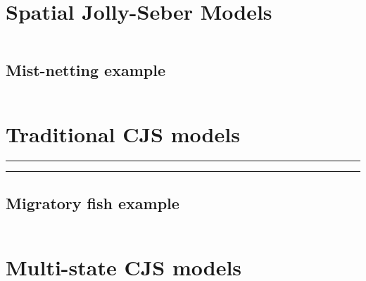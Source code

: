 \section{Spatial Jolly-Seber Models}

\begin{equation}
\label{scr0.eq.norm}
\end{equation}


\subsection{Mist-netting example}

\begin{table}
\centering
\begin{tabular}{crrr}
\hline \hline
\end{tabular}
\label{open.tab.JSmulti}
\end{table}



\begin{figure}
\centering
\label{open.figs.ovenbirdN5hist}
\end{figure}


\section{Traditional CJS models}

\begin{panel}[htp]
\centering
\rule[0.1in]{\textwidth}{.03in}
\rule[-0.1in]{\textwidth}{.03in}
\label{open.panel.nsCJS}
\end{panel}


\begin{figure}
\centering
\label{open.figs.shadpic}
\end{figure}

\subsection{Migratory fish example}

\begin{table}
\centering
\begin{tabular}{crrrrr}
\hline \hline
\hline
\end{tabular}
\label{open.tab.simple-shad}
\end{table}


\section{Multi-state CJS models}

